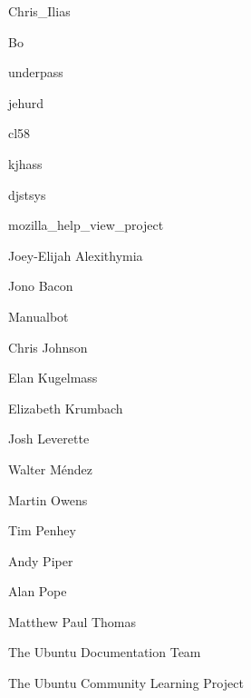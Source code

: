 \vspace{-1\baselineskip}
\begin{credits}
  \item Chris\_Ilias
  \item Bo
  \item underpass
  \item jehurd
  \item cl58
  \item kjhass
  \item djstsys
  \item mozilla\_help\_view\_project
  \item Joey-Elijah Alexithymia
  \item Jono Bacon
  \item Manualbot
  \item Chris Johnson
  \item Elan Kugelmass
  \item Elizabeth Krumbach
  \item Josh Leverette
  \item Walter Méndez
  \item Martin Owens
  \item Tim Penhey
  \item Andy Piper
  \item Alan Pope
  \item Matthew Paul Thomas
\end{credits}
\begingroup%
\small%
\parskip0pt%
\parindent0pt%
\par The Ubuntu Documentation Team
\par The Ubuntu Community Learning Project
\endgroup

